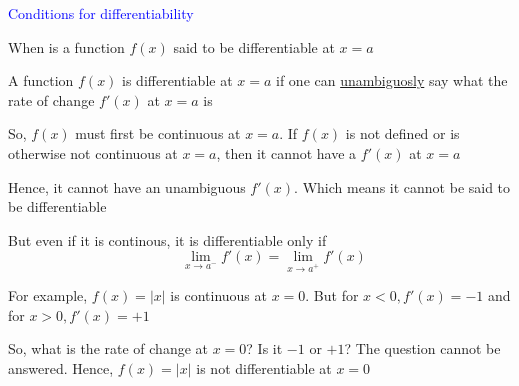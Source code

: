 \documentclass[14pt,fleqn]{extarticle}
\begin{document}
 
\begin{skill}
\begin{narrow}
\textcolor{blue}{Conditions for differentiability}

When is a function $f(x)$ said to be differentiable at $x=a$
\end{narrow}

\reason 

A function $f(x)$ is differentiable at $x=a$ if one can \underline{unambiguosly} say
what the rate of change $f'(x)$ at $x=a$ is \newline 

So, $f(x)$ must first be continuous at $x=a$. If $f(x)$ is not defined or is otherwise not continuous at $x=a$, then it cannot have a $f'(x)$ at $x=a$ \newline \newline 

Hence, it cannot have an unambiguous $f'(x)$. Which means it cannot be said to be differentiable \newline 

But even if it is continous, it is differentiable only if 
\[ \qquad \lim_{x\to a^-} f'(x) = \lim_{x\to a^+} f'(x) \]

For example, $f(x) = \vert x\vert$ is continuous at $x=0$. But for $x < 0, f'(x) = -1$ and for $x > 0, f'(x) = +1$ \newline 

So, what is the rate of change at $x=0$? Is it $-1$ or $+1$? The question cannot be answered. Hence, $f(x)=\vert x\vert$ is not differentiable at $x=0$ 
\end{skill} 
\end{document}
